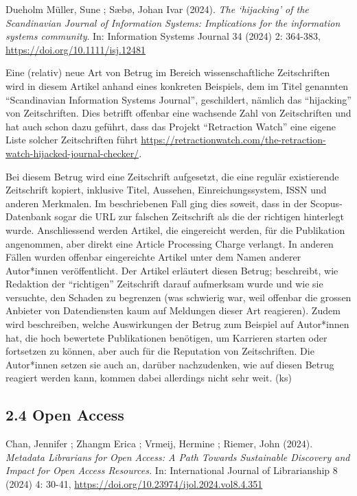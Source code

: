 \documentclass[a4paper,
fontsize=11pt,
oneside,
numbers=noperiodatend,
parskip=half-,
bibliography=totoc,
final
]{scrartcl}
\begin{document}
Dueholm Müller, Sune ; Sæbø, Johan Ivar (2024). \emph{The
\enquote*{hijacking} of the Scandinavian Journal of Information Systems:
Implications for the information systems community}. In: Information
Systems Journal 34 (2024) 2: 364-383,
\url{https://doi.org/10.1111/isj.12481}

Eine (relativ) neue Art von Betrug im Bereich wissenschaftliche
Zeitschriften wird in diesem Artikel anhand eines konkreten Beispiels,
dem im Titel genannten \enquote{Scandinavian Information Systems
Journal}, geschildert, nämlich das \enquote{hijacking} von
Zeitschriften. Dies betrifft offenbar eine wachsende Zahl von
Zeitschriften und hat auch schon dazu geführt, dass das Projekt
\enquote{Retraction Watch} eine eigene Liste solcher Zeitschriften führt
\url{https://retractionwatch.com/the-retraction-watch-hijacked-journal-checker/}.

Bei diesem Betrug wird eine Zeitschrift aufgesetzt, die eine regulär
existierende Zeitschrift kopiert, inklusive Titel, Aussehen,
Einreichungssystem, ISSN und anderen Merkmalen. Im beschriebenen Fall
ging dies soweit, dass in der Scopus-Datenbank sogar die URL zur
falschen Zeitschrift als die der richtigen hinterlegt wurde.
Anschliessend werden Artikel, die eingereicht werden, für die
Publikation angenommen, aber direkt eine Article Processing Charge
verlangt. In anderen Fällen wurden offenbar eingereichte Artikel unter
dem Namen anderer Autor*innen veröffentlicht. Der Artikel erläutert
diesen Betrug; beschreibt, wie Redaktion der \enquote{richtigen}
Zeitschrift darauf aufmerksam wurde und wie sie versuchte, den Schaden
zu begrenzen (was schwierig war, weil offenbar die grossen Anbieter von
Datendiensten kaum auf Meldungen dieser Art reagieren). Zudem wird
beschreiben, welche Auswirkungen der Betrug zum Beispiel auf Autor*innen
hat, die hoch bewertete Publikationen benötigen, um Karrieren starten
oder fortsetzen zu können, aber auch für die Reputation von
Zeitschriften. Die Autor*innen setzen sie auch an, darüber nachzudenken,
wie auf diesen Betrug reagiert werden kann, kommen dabei allerdings
nicht sehr weit. (ks)

\hypertarget{open-access}{%
\subsection{2.4 Open Access}\label{open-access}}

Chan, Jennifer ; Zhangm Erica ; Vrmeij, Hermine ; Riemer, John (2024).
\emph{Metadata Librarians for Open Access: A Path Towards Sustainable
Discovery and Impact for Open Access Resources.} In: International
Journal of Librarianship 8 (2024) 4: 30-41,
\url{https://doi.org/10.23974/ijol.2024.vol8.4.351}
\end{document}
